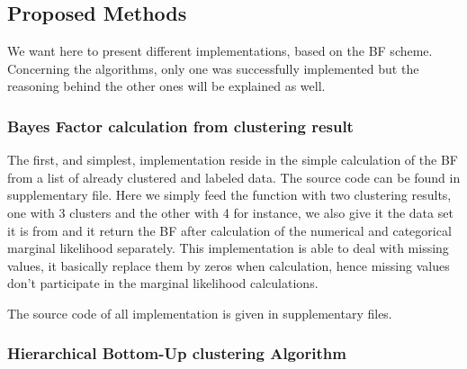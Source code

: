 \documentclass[twocolumn,12pt]{article}
\begin{document}
\subsection{Proposed Methods}

We want here to present different implementations, based on the BF scheme.
Concerning the algorithms, only one was successfully implemented but the reasoning behind the other ones will be explained as well.

\subsubsection{Bayes Factor calculation from clustering result}

The first, and simplest, implementation reside in the simple calculation of the BF from a list of already clustered and labeled data.
The source code can be found in supplementary file.
Here we simply feed the function with two clustering results, one with 3 clusters and the other with 4 for instance, we also give it the data set it is from and it return the BF after calculation of the numerical and categorical marginal likelihood separately.
This implementation is able to deal with missing values, it basically replace them by zeros when calculation, hence missing values don't participate in the marginal likelihood calculations.

The source code of all implementation is given in supplementary files.

\subsubsection{Hierarchical Bottom-Up clustering Algorithm}
\end{document}
